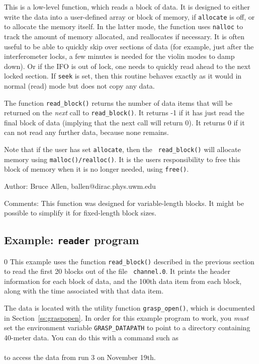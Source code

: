 This is a low-level function, which reads a block of data.  It is
designed to either write the data into a user-defined array or block of
memory, if {\tt allocate} is off, or to allocate the memory itself.  In
the latter mode, the function uses {\tt nalloc} to track the amount of
memory allocated, and reallocates if necessary. 
It is often useful to be able to quickly skip over sections of data
(for example, just after the interferometer locks, a few minutes
is needed for the violin modes to damp down).  Or if the IFO is out of
lock, one needs to quickly read ahead to the next locked section.
If {\tt seek} is set, then this routine behaves exactly as it would in
normal (read) mode but does not copy any data.

The function {\tt read\_block()} returns the number of data items that
will be returned on the {\it next} call to {\tt read\_block()}.  It
returns -1 if it has just read the final block of data (implying that
the next call will return 0).  It returns 0 if it can not read any
further data, because none remains.

Note that if the user has set {\tt allocate}, then the {\tt
read\_block()} will allocate memory using {\tt malloc()/realloc()}.  It
is the users responsibility to free this block of memory when it is no
longer needed, using {\tt free()}.

\begin{description}
\item{Author:}  Bruce Allen, ballen@dirac.phys.uwm.edu
\item{Comments:}  This function was designed for variable-length blocks.  It might
be possible to simplify it for fixed-length block sizes.
\end{description}
\clearpage

\subsection{Example: {\tt reader} program}
\setcounter{equation}0
This example uses the function {\tt read\_block()} described in the
previous section to read the first 20 blocks out of the file {\tt
channel.0}.  It prints the header information for each block of data,
and the 100th data item from each block, along with the time associated
with that data item.

The data is located with the utility function {\tt grasp\_open()},
which is documented in Section~\ref{ss:graspopen}.  In order for
this example program to work, you {\it must} set the environment
variable {\tt GRASP\_DATAPATH} to point to a directory containing
40-meter data.  You can do this with a command such as\\
\\
to access the data from run 3 on November 19th.


